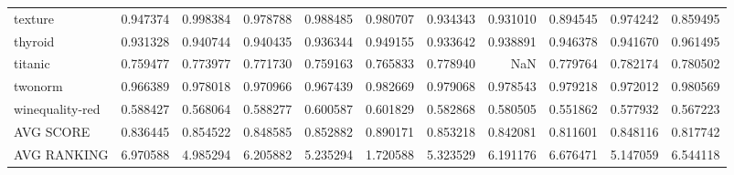 \begin{tabular}{lrrrrrrrrrr}
texture         &   0.947374 &  0.998384 &  0.978788 &  0.988485 &  0.980707 &  0.934343 &  0.931010 &  0.894545 &  0.974242 &  0.859495 \\
thyroid         &   0.931328 &  0.940744 &  0.940435 &  0.936344 &  0.949155 &  0.933642 &  0.938891 &  0.946378 &  0.941670 &  0.961495 \\
titanic         &   0.759477 &  0.773977 &  0.771730 &  0.759163 &  0.765833 &  0.778940 &       NaN &  0.779764 &  0.782174 &  0.780502 \\
twonorm         &   0.966389 &  0.978018 &  0.970966 &  0.967439 &  0.982669 &  0.979068 &  0.978543 &  0.979218 &  0.972012 &  0.980569 \\
winequality-red &   0.588427 &  0.568064 &  0.588277 &  0.600587 &  0.601829 &  0.582868 &  0.580505 &  0.551862 &  0.577932 &  0.567223 \\
AVG SCORE       &   0.836445 &  0.854522 &  0.848585 &  0.852882 &  0.890171 &  0.853218 &  0.842081 &  0.811601 &  0.848116 &  0.817742 \\
AVG RANKING     &   6.970588 &  4.985294 &  6.205882 &  5.235294 &  1.720588 &  5.323529 &  6.191176 &  6.676471 &  5.147059 &  6.544118 \\
\bottomrule
\end{tabular}
